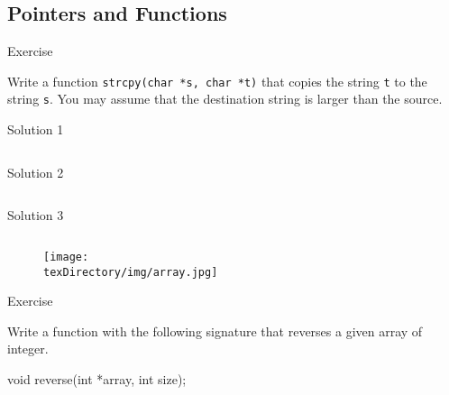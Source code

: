 \documentclass[compress]{beamer}
\begin{document}
\subsection{Pointers and Functions}

\begin{slide}
	\begin{block}{Exercise}

	Write a function \texttt{strcpy(char *s, char *t)} that copies the string \texttt{t} to the string \texttt{s}.
	You may assume that the destination string is larger than the source.

	\end{block}
\end{slide}

\begin{slide}
	\begin{block}{Solution 1}

	\inputminted[fontsize=\scriptsize, firstline=10, linenos]{c}{
		\resDirectory/strcpy1.c
	}

	\end{block}
\end{slide}

\begin{slide}
	\begin{block}{Solution 2}

	\inputminted[fontsize=\scriptsize, firstline=10, linenos]{c}{
		\resDirectory/strcpy2.c
	}

	\end{block}
\end{slide}

\begin{slide}
	\begin{block}{Solution 3}

	\inputminted[fontsize=\scriptsize, firstline=10, linenos]{c}{
		\resDirectory/strcpy3.c
	}

	\end{block}
\end{slide}

\begin{slide}
	\begin{figure}
	\texttt{[image: \\texDirectory/img/array.jpg]}
	\end{figure}
\end{slide}

\begin{slide}
	\begin{block}{Exercise}

	Write a function with the following signature that reverses a given array of integer.

	\begin{terminal}
	void reverse(int *array, int size);
	\end{terminal}

	\end{block}
\end{slide}
\end{document}
